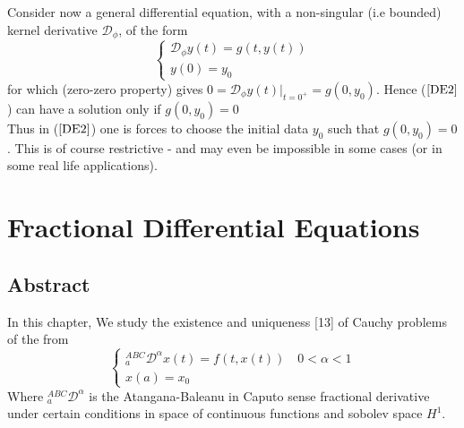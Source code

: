 \documentclass[twoside]{book}
\begin{document}
{Consider now a general differential equation, with a non-singular (i.e bounded) kernel derivative $\mathcal{D}_{\phi}$, of the form\\
\begin{equation}
    \label{DE2}
    \begin{cases}
        \mathcal{D}_{\phi} y(t) = g(t,y(t)) \\
        y(0) =y_0
    \end{cases}
\end{equation}
for which (zero-zero property) gives $0 = \mathcal{D}_{\phi}y(t) |_{t=0 ^+} = g(0,y_0)$. Hence ($\ref{DE2}$) can have a solution only if $g(0,y_0) = 0$\\
Thus in ($\ref{DE2}$) one is forces to choose the initial data $y_0$ such that $g(0,y_0) = 0$. This is of course restrictive - and may even be impossible in some cases (or in some real life applications).

\vspace{0.5em}

\chapter{Fractional Differential Equations}
\section{Abstract}
In this chapter, We study the existence and uniqueness [13] of Cauchy problems of the from
\begin{equation}
    \label{ex-cauchy}
    \begin{cases}
        ^{ABC} _{a}\mathcal{D}^{\alpha} x(t) = f(t,x(t)) \quad 0<\alpha<1 \\
        x(a) = x_0
    \end{cases}
\end{equation}
Where $ ^{ABC}_{a}\mathcal{D}^{\alpha}$ is the Atangana-Baleanu in Caputo sense fractional derivative under certain conditions in space of continuous functions and sobolev space $H^1$.

}
\end{document}
